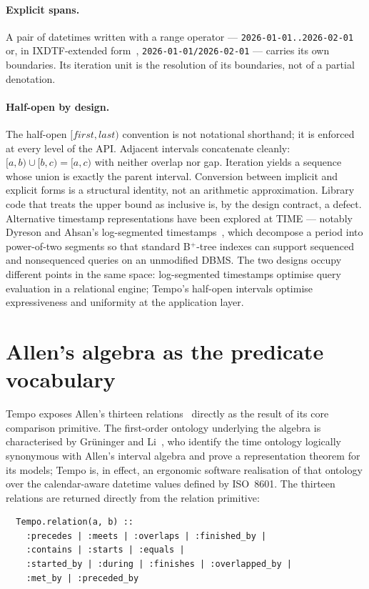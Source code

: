 \paragraph*{Explicit spans.} A pair of datetimes written with a range
operator --- \texttt{2026-01-01..2026-02-01} or, in IXDTF-extended
form~\cite{ixdtf}, \texttt{2026-01-01/2026-02-01} --- carries its own
boundaries. Its iteration unit is the resolution of its boundaries,
not of a partial denotation.

\paragraph*{Half-open by design.} The half-open $[\mathit{first},
\mathit{last})$ convention is not notational shorthand; it is enforced
at every level of the API. Adjacent intervals concatenate cleanly:
$[a, b) \cup [b, c) = [a, c)$ with neither overlap nor gap. Iteration
yields a sequence whose union is exactly the parent interval.
Conversion between implicit and explicit forms is a structural
identity, not an arithmetic approximation. Library code that treats
the upper bound as inclusive is, by the design contract, a defect.
Alternative timestamp representations have been explored at TIME ---
notably Dyreson and Ahsan's log-segmented
timestamps~\cite{dyreson2021logsegmented,dyreson2023logsegmented},
which decompose a period into power-of-two segments so that standard
B$^+$-tree indexes can support sequenced and nonsequenced queries on
an unmodified DBMS. The two designs occupy different points in the
same space: log-segmented timestamps optimise query evaluation in a
relational engine; Tempo's half-open intervals optimise expressiveness
and uniformity at the application layer.

\section{Allen's algebra as the predicate vocabulary}

Tempo exposes Allen's thirteen relations~\cite{allen1983} directly as
the result of its core comparison primitive. The first-order ontology
underlying the algebra is characterised by Gr\"uninger and
Li~\cite{gruninger2017allenontology}, who identify the time ontology
logically synonymous with Allen's interval algebra and prove a
representation theorem for its models; Tempo is, in effect, an
ergonomic software realisation of that ontology over the
calendar-aware datetime values defined by ISO~8601. The thirteen
relations are returned directly from the relation primitive:
\begin{verbatim}
  Tempo.relation(a, b) ::
    :precedes | :meets | :overlaps | :finished_by |
    :contains | :starts | :equals |
    :started_by | :during | :finishes | :overlapped_by |
    :met_by | :preceded_by
\end{verbatim}

